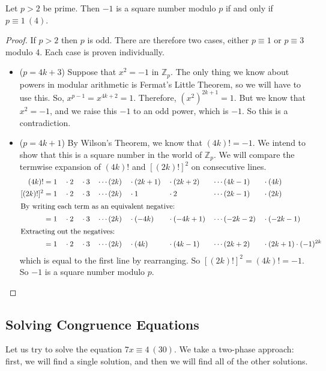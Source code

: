 \begin{proposition}
	Let \(p>2\) be prime.
	Then \(-1\) is a square number modulo \(p\) if and only if \(p \equiv 1\ (4)\).
\end{proposition}
\begin{proof}
	If \(p>2\) then \(p\) is odd.
	There are therefore two cases, either \(p \equiv 1\) or \(p \equiv 3\) modulo 4.
	Each case is proven individually.
	\begin{itemize}
		\item (\(p = 4k + 3\)) Suppose that \(x^2 = -1\) in \(\mathbb Z_p\).
		      The only thing we know about powers in modular arithmetic is Fermat's Little Theorem, so we will have to use this.
		      So, \(x^{p-1} = x^{4k+2} = 1\).
		      Therefore, \((x^2)^{2k+1} = 1\).
		      But we know that \(x^2=-1\), and we raise this \(-1\) to an odd power, which is \(-1\).
		      So this is a contradiction.
		\item (\(p = 4k + 1\)) By Wilson's Theorem, we know that \((4k)!
		      = -1\).
		      We intend to show that this is a square number in the world of \(\mathbb Z_p\).
		      We will compare the termwise expansion of \((4k)!
		      \) and \([(2k)!]^2\) on consecutive lines.
		      \begin{alignat*}{9}
			      (4k)!
			                & = 1 &  & \cdot 2 &  & \cdot 3 &  & \cdots (2k) &  & \cdot (2k+1) &  & \cdot (2k+2)  &  & \cdots (4k-1)  &  & \cdot (4k)                   \\
			      [(2k)!]^2 & = 1 &  & \cdot 2 &  & \cdot 3 &  & \cdots (2k) &  & \cdot 1      &  & \cdot 2       &  & \cdots (2k-1)  &  & \cdot (2k)                   \\
			      \intertext{By writing each term as an equivalent negative:}
			                & = 1 &  & \cdot 2 &  & \cdot 3 &  & \cdots (2k) &  & \cdot (-4k)  &  & \cdot (-4k+1) &  & \cdots (-2k-2) &  & \cdot (-2k-1)                \\
			      \intertext{Extracting out the negatives:}
			                & = 1 &  & \cdot 2 &  & \cdot 3 &  & \cdots (2k) &  & \cdot (4k)   &  & \cdot (4k-1)  &  & \cdots (2k+2)  &  & \cdot (2k+1) \cdot (-1)^{2k}
		      \end{alignat*}
		      which is equal to the first line by rearranging.
		      So \([(2k)!]^2 = (4k)!
		      = -1\).
		      So \(-1\) is a square number modulo \(p\).
	\end{itemize}
\end{proof}

\subsection{Solving Congruence Equations}
Let us try to solve the equation \(7x \equiv 4\ (30)\).
We take a two-phase approach: first, we will find a single solution, and then we will find all of the other solutions.

